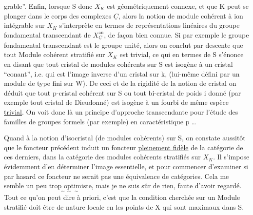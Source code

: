 
grable''. \inserted{[}Enfin, lorsque S donc $X_K$ est géométriquement connexe, et que K peut se plonger dans le corps des complexes $\underline C$, alors la notion de module cohérent à ion intégrable sur $X_K$ s'interprète en termes de représentations linéaires  du groupe fondamental  transcendant de $X_{\underline C}^{\mathrm{an}}$, de façon bien connue. Si par exemple le groupe fondamental transcendant est le groupe unité, alors on conclut par descente que tout Module cohérent stratifié sur $X_K$ est trivial, ce qui en termes de S s'énonce en disant que tout cristal de modules cohérents sur S est isogène à un cristal ``conant'', i.e.   qui est l'image inverse d'un cristal sur k, (lui-même défini par un module de type fini sur W). De ceci et de la rigidité de la notion de cristal on déduit que tout p-cristal cohérent sur S ou tout bi-cristal de poids i donné (par exemple tout cristal de Dieudonné)  est isogène à un fourbi de même espèce \uline{trivial}. On voit donc là un principe d'approche transcendante pour l'étude des familles de groupes formels (par exemple) en caractéristique p \ldots\inserted{]}

Quand à la notion d'isocristal (de modules cohérents) sur S, on constate aussitôt que le foncteur précédent induit un foncteur \uline{pleinement fidèle} de la catégorie de ces derniers, dans la catégorie des modules cohérents stratifiés sur $X_K$. Il s'impose évidemment d'en déterminer l'image essentielle, et pour commencer d'examiner  si par hasard ce foncteur ne serait pas une équivalence de catégories. \deleted{\unsure{(}}Cela me semble un peu $\underset{\sim\ \sim\ \sim}{\text{trop optimiste}}$, mais je ne suis sûr de rien, faute d'avoir regardé.
Tout ce qu'on peut dire à priori, c'est que la condition cherchée sur un Module stratifié doit être de nature locale en les points de X qui sont maximaux dans S.

